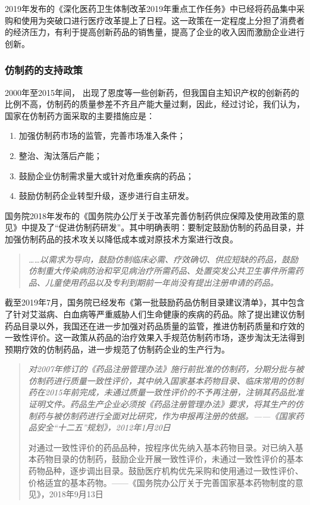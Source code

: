 \documentclass{apa6}
\begin{document}
			2019年发布的《深化医药卫生体制改革2019年重点工作任务》中已经将药品集中采购和使用为突破口进行医疗改革提上了日程。这一政策在一定程度上分担了消费者的经济压力，有利于提高创新药品的销售量，提高了企业的收入因而激励企业进行创新。
			
			\subsubsection{仿制药的支持政策}
			
			2000年至2015年间， 出现了恩度等一些创新药，但我国自主知识产权的创新药的比例不高，仿制药的质量参差不齐且产能大量过剩，因此，经过讨论，我们认为，国家在仿制药方面采取的主要措施应是：
			
			\begin{enumerate}
				\item 加强仿制药市场的监管，完善市场准入条件；
				\item 整治、淘汰落后产能；
				\item 鼓励企业仿制需求量大或针对危重疾病的药品；
				\item 鼓励仿制药企业转型升级，逐步进行自主研发。
			\end{enumerate}
			
			国务院2018年发布的《国务院办公厅关于改革完善仿制药供应保障及使用政策的意见》中提及了“促进仿制药研发”。其中明确表明：要制定鼓励仿制的药品目录，并加强仿制药品的技术攻关以降低成本或对原技术方案进行改良。
			
			\begin{quotation}
				\itshape
				……以需求为导向，鼓励仿制临床必需、疗效确切、供应短缺的药品，鼓励仿制重大传染病防治和罕见病治疗所需药品、处置突发公共卫生事件所需药品、儿童使用药品以及专利到期前一年尚没有提出注册申请的药品。
			\end{quotation}
			
			截至2019年7月，国务院已经发布《第一批鼓励药品仿制目录建议清单》，其中包含了针对艾滋病、白血病等严重威胁人们生命健康的疾病的药品。除了提出建议仿制药品目录以外，我国还在进一步加强对药品质量的监管，推进仿制药质量和疗效的一致性评价。这一政策从药品的治疗效果入手规范仿制药市场，逐步淘汰无法得到预期疗效的仿制药品，进一步规范了仿制药企业的生产行为。
			
			\begin{quotation}
				\itshape
				对2007年修订的《药品注册管理办法》施行前批准的仿制药，分期分批与被仿制药进行质量一致性评价，其中纳入国家基本药物目录、临床常用的仿制药在2015年前完成，未通过质量一致性评价的不予再注册，注销其药品批准证明文件。药品生产企业必须按《药品注册管理办法》要求，将其生产的仿制药与被仿制药进行全面对比研究，作为申报再注册的依据。——《国家药品安全“十二五”规划》，2012年1月20日
				
				对通过一致性评价的药品品种，按程序优先纳入基本药物目录。对已纳入基本药物目录的仿制药，鼓励企业开展一致性评价，未通过一致性评价的基本药物品种，逐步调出目录。鼓励医疗机构优先采购和使用通过一致性评价、价格适宜的基本药物。——《国务院办公厅关于完善国家基本药物制度的意见》，2018年9月13日
			\end{quotation}
\end{document}
